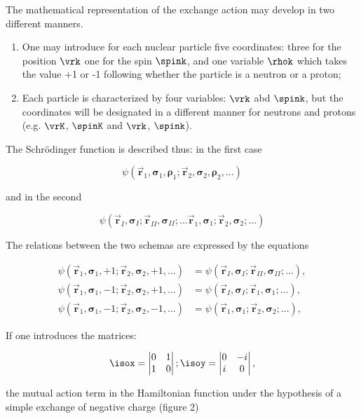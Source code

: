 \documentclass{article}
\newcommand{\var}[1]{\pmb{#1}}
\newcommand{\comp}[1]{{#1}}
\newcommand{\vect}[1]{\vec{\var{#1}}}
\newcommand{\vrX}[1]{\vect{r}_{\comp{#1}}}
\newcommand{\rhoX}[1]{\var{\rho}_{\comp{#1}}}
\newcommand{\spinX}[1]{\var{\sigma}_{\comp{#1}}}
\newcommand{\nequ}[2]{
\begin{equation*}
#1
\tag{#2}
\end{equation*}
}
\newcommand{\uequ}[1]{
\begin{equation*}
#1
\end{equation*}
}
\begin{document}
The mathematical representation of the exchange action may develop in two different manners.
\begin{enumerate}
    \item One may introduce for each nuclear particle five coordinates: three for the position $\vrk$ one for the spin $\spink$, and one variable $\rhok$ which takes the value +1 or -1 following whether the particle is a neutron or a proton;
    \item Each particle is characterized by four variables: $\vrk$ abd $\spink$, but the coordinates will be designated in a different manner for neutrons and protons (e.g. $\vrK$, $\spinK$ and $\vrk$, $\spink$).
\end{enumerate}

The Schrödinger function is described thus: in the first case

\uequ{
\psi(\vrX{1}, \spinX{1}, \rhoX{1}; \vrX{2}, \spinX{2}, \rhoX{2}, ...)
}

and in the second

\uequ{
\psi(\vrX{I}, \spinX{I}; \vrX{II}, \spinX{II}; ... \vrX{1}, \spinX{1}; \vrX{2}, \spinX{2}; ... )
}

The relations between the two schemas are expressed by the equations

\nequ{
\begin{split}
\psi(\vrX{1}, \spinX{1}, +1; \vrX{2}, \spinX{2}, +1, ...) &= \psi(\vrX{I}, \spinX{I}; \vrX{II}, \spinX{II}; ...),\\
\psi(\vrX{1}, \spinX{1}, -1; \vrX{2}, \spinX{2}, +1, ...) &= \psi(\vrX{I}, \spinX{I}; \vrX{1}, \spinX{1}; ...),\\
\psi(\vrX{1}, \spinX{1}, -1; \vrX{2}, \spinX{2}, -1, ...) &= \psi(\vrX{1}, \spinX{1}; \vrX{2}, \spinX{2}; ...),
\end{split}
}{9}

If one introduces the matrices:

\uequ{
\isox = \begin{vmatrix}
 0 & 1\\
 1 & 0
\end{vmatrix};
\isoy = \begin{vmatrix}
0 & -i\\
i & 0
\end{vmatrix},
}

the mutual action term in the Hamiltonian function under the hypothesis of a simple exchange of negative charge (figure 2)
\end{document}
